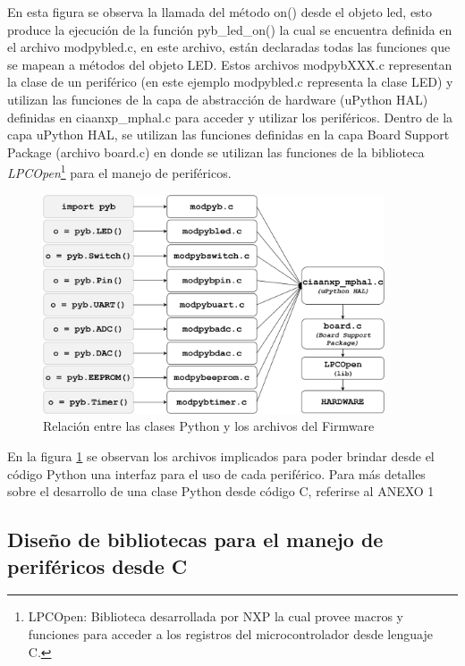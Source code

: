 En esta figura se observa la llamada del método on() desde el objeto led, esto produce la ejecución de la función pyb\_led\_on() la cual se encuentra definida en el archivo modpybled.c, en este archivo, están declaradas todas las funciones que se mapean a métodos del objeto LED.
Estos archivos modpybXXX.c representan la clase de un periférico (en este ejemplo modpybled.c representa la clase LED) y utilizan las funciones de la capa de abstracción de hardware (uPython HAL) definidas en ciaanxp\_mphal.c para acceder y utilizar los periféricos.
Dentro de la capa uPython HAL, se utilizan las funciones definidas en la capa Board Support Package (archivo board.c) en donde se utilizan las funciones de la biblioteca \textit{LPCOpen}\footnote{LPCOpen: Biblioteca desarrollada por NXP la cual provee macros y funciones para acceder a los registros del microcontrolador desde lenguaje C.} para el manejo de periféricos.

\begin{figure}[ht]
  \centering
    \includegraphics[width=0.9\textwidth]{Figures/fig_files}
  \caption{Relación entre las clases Python y los archivos del Firmware}
  \label{fig:files}
\end{figure}

En la figura \ref{fig:files} se observan los archivos implicados para poder brindar desde el código Python una interfaz para el uso de cada periférico.
Para más detalles sobre el desarrollo de una clase Python desde código C, referirse al ANEXO 1


\subsection{Diseño de bibliotecas para el manejo de periféricos desde C}

